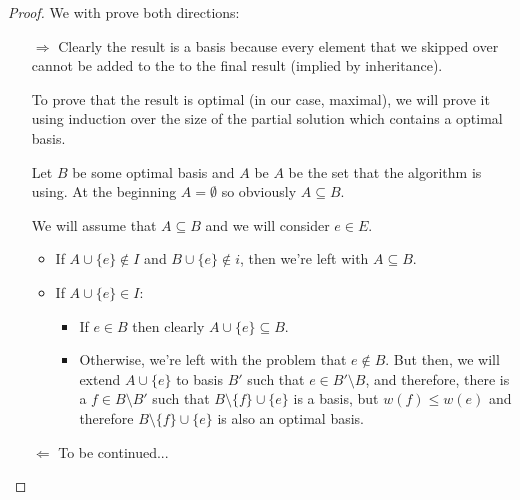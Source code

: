 \documentclass[00_complete]{subfiles}
\begin{document}
\begin{proof}
    We with prove both directions:
    \begin{itemize}
        \item[$\Rightarrow$] Clearly the result is a basis because every element
            that we skipped over cannot be added to the to the final result
            (implied by inheritance).

            To prove that the result is optimal (in our case, maximal), we will
            prove it using induction over the size of the partial solution which
            contains a optimal basis.

            Let $ B $ be some optimal basis and $ A $ be $ A $ be the set that
            the algorithm is using. At the beginning $ A = \emptyset $ so
            obviously $ A \subseteq B $.

            We will assume that $ A \subseteq B $ and we will consider $ e \in E
            $. 
            \begin{itemize}
                \item If $ A \cup \{e\} \notin I $ and $ B \cup \{e\} \notin i
                    $, then we're left with $ A \subseteq B $.

                \item If $ A \cup \{e\} \in I $:
                    \begin{itemize}
                        \item If $ e \in B $ then clearly $ A \cup \{e\}
                            \subseteq B$.

                        \item Otherwise, we're left with the problem that $ e
                            \notin B $. But then, we will extend $ A \cup \{e\}
                            $ to basis $ B' $ such that $ e \in B' \setminus B$,
                            and therefore, there is a $ f \in B \setminus B' $
                            such that $ B \setminus \{f\} \cup \{e\} $ is a
                            basis, but $ w(f) \leq w(e) $ and therefore $ B
                            \setminus \{f\} \cup \{e\} $ is also an optimal
                            basis. 
                    \end{itemize} 
            \end{itemize}
        \item[$\Leftarrow$] To be continued... 
    \end{itemize}
\end{proof}
\end{document}
